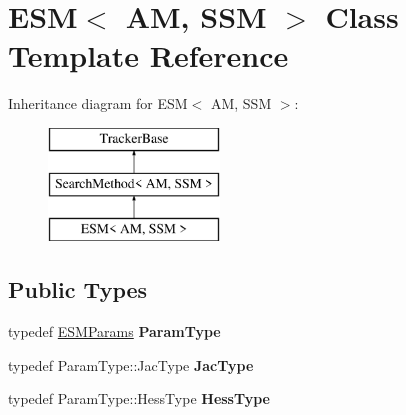 \hypertarget{classESM}{\section{E\-S\-M$<$ A\-M, S\-S\-M $>$ Class Template Reference}
\label{classESM}
}
Inheritance diagram for E\-S\-M$<$ A\-M, S\-S\-M $>$\-:\begin{figure}[H]
\begin{center}
\leavevmode
\includegraphics[height=3.000000cm]{classESM}
\end{center}
\end{figure}
\subsection*{Public Types}
\begin{DoxyCompactItemize}
\item 
\hypertarget{classESM_a30b6609c9b894182e6fab15d725fe64c}{typedef \hyperlink{structESMParams}{E\-S\-M\-Params} {\bfseries Param\-Type}}\label{classESM_a30b6609c9b894182e6fab15d725fe64c}

\item 
\hypertarget{classESM_a4d4d5b39b63a16173d4b50d0a811195b}{typedef Param\-Type\-::\-Jac\-Type {\bfseries Jac\-Type}}\label{classESM_a4d4d5b39b63a16173d4b50d0a811195b}

\item 
\hypertarget{classESM_a3f8ad5f74ac439f7c2681143d5b6507b}{typedef Param\-Type\-::\-Hess\-Type {\bfseries Hess\-Type}}\label{classESM_a3f8ad5f74ac439f7c2681143d5b6507b}

\end{DoxyCompactItemize}
